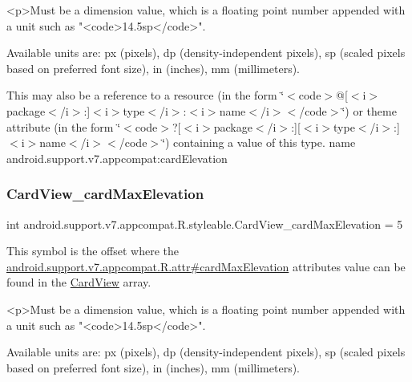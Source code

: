 \begin{DoxyVerb}      <p>Must be a dimension value, which is a floating point number appended with a unit such as "<code>14.5sp</code>".
\end{DoxyVerb}
 Available units are\+: px (pixels), dp (density-\/independent pixels), sp (scaled pixels based on preferred font size), in (inches), mm (millimeters). 

This may also be a reference to a resource (in the form \char`\"{}$<$code$>$@\mbox{[}$<$i$>$package$<$/i$>$\+:\mbox{]}$<$i$>$type$<$/i$>$\+:$<$i$>$name$<$/i$>$$<$/code$>$\char`\"{}) or theme attribute (in the form \char`\"{}$<$code$>$?\mbox{[}$<$i$>$package$<$/i$>$\+:\mbox{]}\mbox{[}$<$i$>$type$<$/i$>$\+:\mbox{]}$<$i$>$name$<$/i$>$$<$/code$>$\char`\"{}) containing a value of this type.  name android.\+support.\+v7.\+appcompat\+:card\+Elevation \mbox{\label{classandroid_1_1support_1_1v7_1_1appcompat_1_1R_1_1styleable_a8c5ed09c377e83d942b47c13e8f01e50}} 
\subsubsection{\texorpdfstring{Card\+View\+\_\+card\+Max\+Elevation}{CardView\_cardMaxElevation}}
{\footnotesize\ttfamily int android.\+support.\+v7.\+appcompat.\+R.\+styleable.\+Card\+View\+\_\+card\+Max\+Elevation = 5\hspace{0.3cm}{\ttfamily [static]}}

This symbol is the offset where the \hyperlink{classandroid_1_1support_1_1v7_1_1appcompat_1_1R_1_1attr_ad913746d1d0e1d87003d6eac9574961c}{android.\+support.\+v7.\+appcompat.\+R.\+attr\#card\+Max\+Elevation} attribute\textquotesingle{}s value can be found in the \hyperlink{classandroid_1_1support_1_1v7_1_1appcompat_1_1R_1_1styleable_aee2dd81febffbeeaeff51a35af0f87ec}{Card\+View} array.

\begin{DoxyVerb}      <p>Must be a dimension value, which is a floating point number appended with a unit such as "<code>14.5sp</code>".
\end{DoxyVerb}
 Available units are\+: px (pixels), dp (density-\/independent pixels), sp (scaled pixels based on preferred font size), in (inches), mm (millimeters). 

